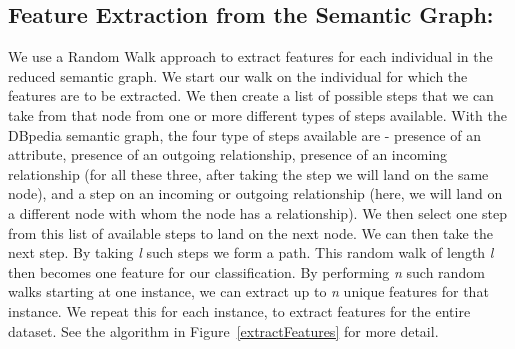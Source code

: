 \documentclass[runningheads,a4paper]{IEEEtran}
\begin{document}
\subsection{Feature Extraction from the Semantic Graph:}
\label{featureExtraction}
We use a Random Walk approach to extract  features for each individual \cite{tsuda2010graph} in the reduced semantic graph. 
We start our walk on the individual for which the features are to be extracted. We then create a 
list of possible steps that we can take from that node from one or more different types of steps available. 
With the DBpedia semantic graph, the four type of steps available are - 
presence of an attribute, presence of an outgoing relationship, presence of an incoming relationship (for all these three, after taking the step we will land on the same node), and a step on an incoming or outgoing relationship (here, we will land on a different node with whom the node has a relationship). 
We then select one step from this list of available steps to land on the next node. We can then take the next step. 
By taking \textit{l} such steps
we form a path. 
This random walk of length \textit{l} then becomes one feature for our classification. By performing \textit{n} such random walks starting at one instance, we can extract up to \textit{n} unique features for that instance. We repeat this for each instance, to extract features for the entire dataset.
See the algorithm in Figure~\ref{extractFeatures} for more detail. 
\end{document}
